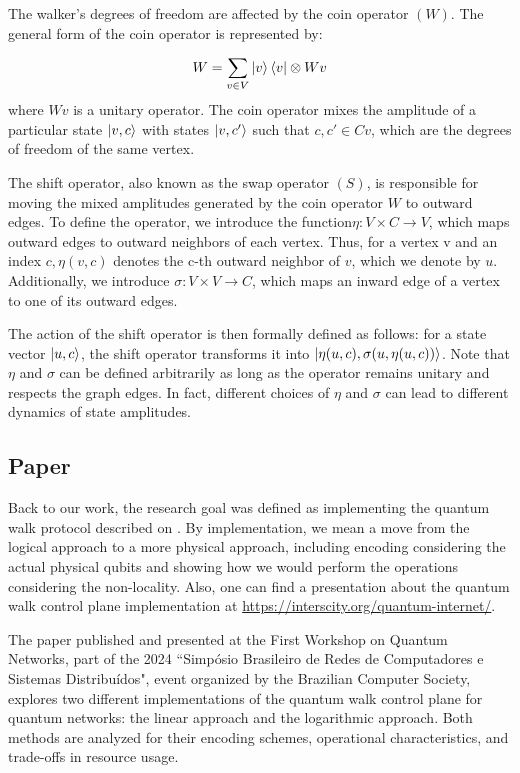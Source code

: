 \documentclass{article}
\begin{document}
		The walker's degrees of freedom are affected by the coin operator $(W)$. The general form of the coin operator is represented by:

		$$W = \sum_{v \in V} \ket{v} \bra{v} \otimes Wv$$ where $Wv$ is a unitary operator. The coin operator mixes the amplitude of a particular state $\ket{v,c}$ with states $\ket{v,c'}$ such that $c, c' \in Cv$, which are the degrees of freedom of the same vertex. \cite{equivalence}

		The shift operator, also known as the swap operator $(S)$, is responsible for moving the mixed amplitudes generated by the coin operator $W$ to outward edges. To define the operator, we introduce the function$ \eta: V \times C \to V$, which maps outward edges to outward neighbors of each vertex. Thus, for a vertex v and an index $c, \eta(v, c)$ denotes the c-th outward neighbor of $v$, which we denote by $u$. Additionally, we introduce $\sigma: V \times V \to C$, which maps an inward edge of a vertex to one of its outward edges.
		
		The action of the shift operator is then formally defined as follows: for a state vector $\ket{u,c}$, the shift operator transforms it into $\ket{\eta(u,c), \sigma(u,\eta(u,c))}$. Note that $\eta$ and $\sigma$ can be defined arbitrarily as long as the operator remains unitary and respects the graph edges. In fact, different choices of $\eta$ and $\sigma$ can lead to different dynamics of state amplitudes. \cite{equivalence}

	\subsection{Paper}
	
		Back to our work, the research goal was defined as implementing the quantum walk protocol described on \cite{controlplane}. By implementation, we mean a move from the logical approach to a more physical approach, including encoding considering the actual physical qubits and showing how we would perform the operations considering the non-locality. Also, one can find a presentation about the quantum walk control plane
		implementation at  \href{https://interscity.org/quantum-internet/}{https://interscity.org/quantum-internet/}.

		The paper \cite{meu} published and presented at the First Workshop on Quantum Networks, part of the 2024 ``Simpósio Brasileiro de Redes de Computadores e Sistemas Distribuídos", event organized by the Brazilian Computer Society, explores two different implementations of the quantum walk control plane for quantum networks: the linear approach and the logarithmic approach. Both methods are analyzed for their encoding schemes, operational characteristics, and trade-offs in resource usage. 
		
\end{document}
